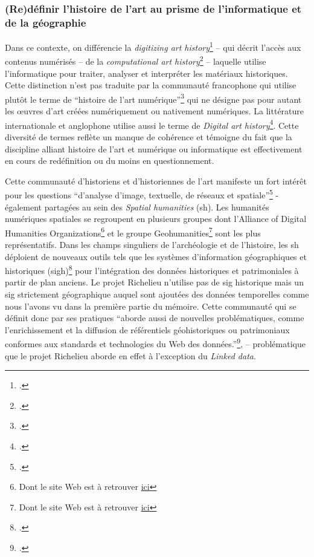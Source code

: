 \subsubsection{(Re)définir l'histoire de l'art au prisme de l'informatique et de la géographie}
Dans ce contexte, on différencie la \textit{digitizing art history}\footcite{JOYEUX-PRUNELNumerique2021} -- qui décrit l'accès aux contenus numérisés -- de la \textit{computational art history}\footcite{BONFAITHumanites2021a} -- laquelle utilise l'informatique pour traiter, analyser et interpréter les matériaux historiques. Cette distinction n'est pas traduite par la communauté francophone qui utilise plutôt le terme de \enquote{histoire de l'art numérique}\footcite{DHIPARISRegistration2024} qui ne désigne pas pour autant les œuvres d'art créées numériquement ou nativement numériques. La littérature internationale et anglophone utilise aussi le terme de \textit{Digital art history}\footcite{IMPETTThere2022}. Cette diversité de termes reflète un manque de cohérence et témoigne du fait que la discipline alliant histoire de l'art et numérique ou informatique est effectivement en cours de redéfinition ou du moins en questionnement.

Cette communauté d'historiens et d'historiennes de l'art manifeste un fort intérêt pour les questions \enquote{d'analyse d'image, textuelle, de réseaux et spatiale}\footcite{BONFAITHumanites2021a} - également partagées au sein des \textit{Spatial humanities} (\acrshort{sh}). Les humanités numériques spatiales se regroupent en plusieurs groupes dont l'Alliance of Digital Humanities Organizations\footnote{Dont le site Web est à retrouver \href{https://adho.org/}{ici}} et le groupe Geohumanities\footnote{Dont le site Web est à retrouver \href{https://geohumanities.org/}{ici}} sont les plus représentatifs. Dans les champs singuliers de l'archéologie et de l'histoire, les \acrshort{sh} déploient de nouveaux outils tels que les systèmes d'information géographiques et historiques (\acrshort{sigh})\footcite{DUMENIEUsysteme2015} pour l'intégration des données historiques et patrimoniales à partir de plan anciens. Le projet Richelieu n'utilise pas de \acrshort{sig} historique mais un \acrshort{sig} strictement géographique auquel sont ajoutées des données temporelles comme nous l'avons vu dans la première partie du mémoire. Cette communauté qui se définit donc par ses pratiques \enquote{aborde aussi de nouvelles problématiques, comme l’enrichissement et la diffusion de référentiels géohistoriques ou patrimoniaux conformes aux standards et technologies du Web des  données.}\footcite{BRANDOIntroduction2021}, -- problématique que le projet Richelieu aborde en effet à l'exception du \textit{Linked data}.

